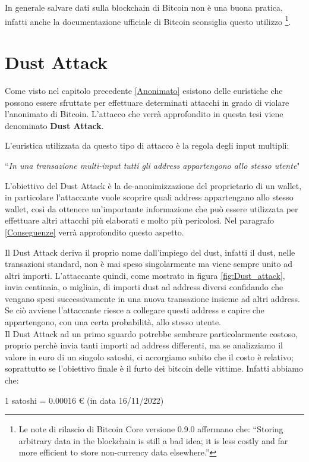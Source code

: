 In generale salvare dati sulla blockchain di Bitcoin non è una buona pratica, infatti anche la documentazione ufficiale di Bitcoin sconsiglia questo utilizzo \footnote{Le note di rilascio di  Bitcoin Core versione 0.9.0 affermano che: “Storing arbitrary data in the blockchain is still a bad idea; it is less costly and far more efficient to store non-currency data elsewhere.”}.
\section{Dust Attack}
Come visto nel capitolo precedente \ref{Anonimato} esistono delle euristiche che possono essere sfruttate per effettuare determinati attacchi in grado di violare l'anonimato di Bitcoin. L'attacco che verrà approfondito in questa tesi viene denominato \textbf{Dust Attack}. 

L'euristica utilizzata da questo tipo di attacco è la regola degli input multipli:
\begin{center}
    ``\textit{In una transazione multi-input tutti gli address appartengono allo stesso utente}"
\end{center}
L'obiettivo del Dust Attack è la de-anonimizzazione del proprietario di un wallet, in particolare l'attaccante vuole scoprire quali address appartengano allo stesso wallet, così da ottenere un'importante informazione che può essere utilizzata per effettuare altri attacchi più elaborati e molto più pericolosi. Nel paragrafo \ref{Conseguenze} verrà approfondito questo aspetto.

Il Dust Attack deriva il proprio nome dall'impiego del dust, infatti il dust, nelle transazioni standard, non è mai speso singolarmente ma viene sempre unito ad altri importi. L'attaccante quindi, come mostrato in figura \ref{fig:Dust_attack}, invia centinaia, o migliaia, di importi dust ad address diversi confidando che vengano spesi successivamente in una nuova transazione insieme ad altri address. Se ciò avviene l'attaccante riesce a collegare questi address e capire che appartengono, con una certa probabilità, allo stesso utente.\\ 

Il Dust Attack ad un primo sguardo potrebbe sembrare particolarmente costoso, proprio perchè invia tanti importi ad address differenti, ma se analizziamo il valore in euro di un singolo satoshi, ci accorgiamo subito che il costo è relativo; soprattutto se l'obiettivo finale è il furto dei bitcoin delle vittime. Infatti abbiamo che:
\begin{center}
    1 satoshi = 0.00016 € (in data 16/11/2022) 
\end{center}

